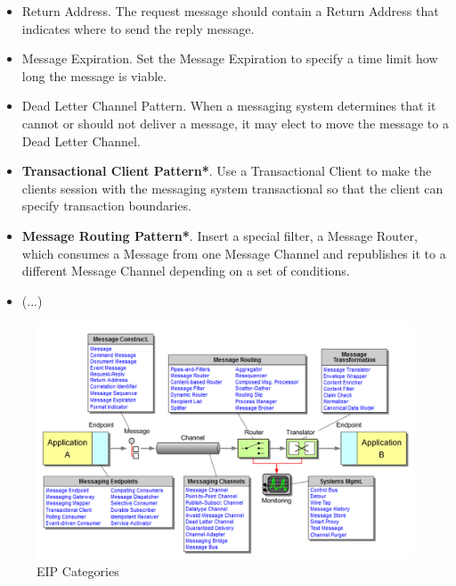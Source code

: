 \documentclass[../Main.tex]{subfiles}
\begin{document}
\begin{multicols}{2}
\begin{itemize}
        \item Return Address. The request message should contain a Return Address that indicates where to send the reply message.
        \item Message Expiration.  Set the Message Expiration to specify a time limit how long the message is viable.
        \item Dead Letter Channel Pattern. When a messaging system determines that it cannot or should not deliver a message, it may elect to move 
        the message to a Dead Letter Channel.
        \item \textbf{Transactional Client Pattern*}. Use a Transactional Client to make the clients session with the messaging system 
        transactional so that the client can specify transaction boundaries.
        \item \textbf{Message Routing Pattern*}. Insert a special filter, a Message Router, which consumes a Message from one Message 
        Channel and republishes it to a different Message Channel depending on a set of conditions. 
        \item (...)
    \end{itemize}
\end{multicols}
\newpage

\begin{figure}[H]
    \centering
    \includegraphics[width=1\linewidth]{Images/eip-categories.png}
    \caption{EIP Categories}
\end{figure}
\end{document}

